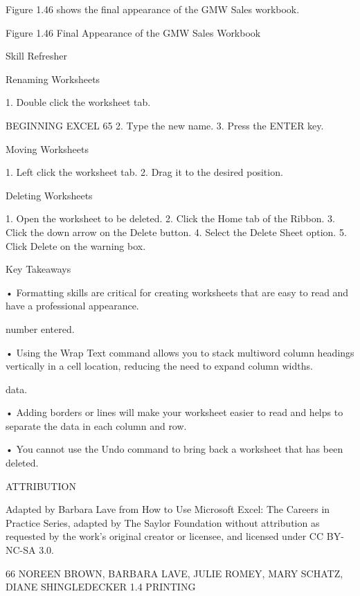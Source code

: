 Figure 1.46 shows the final appearance of the GMW Sales workbook.




Figure 1.46 Final Appearance of the GMW Sales Workbook




Skill Refresher


Renaming Worksheets

1. Double click the worksheet tab.


BEGINNING EXCEL 65
2. Type the new name.
3. Press the ENTER key.

Moving Worksheets

1. Left click the worksheet tab.
2. Drag it to the desired position.

Deleting Worksheets

1. Open the worksheet to be deleted.
2. Click the Home tab of the Ribbon.
3. Click the down arrow on the Delete button.
4. Select the Delete Sheet option.
5. Click Delete on the warning box.




Key Takeaways


• Formatting skills are critical for creating worksheets that are easy to read and have a professional
appearance.

number entered.

• Using the Wrap Text command allows you to stack multiword column headings vertically in a cell location,
reducing the need to expand column widths.

data.

• Adding borders or lines will make your worksheet easier to read and helps to separate the data in each
column and row.

• You cannot use the Undo command to bring back a worksheet that has been deleted.



ATTRIBUTION

Adapted by Barbara Lave from How to Use Microsoft Excel: The Careers in Practice Series, adapted
by The Saylor Foundation without attribution as requested by the work’s original creator or
licensee, and licensed under CC BY-NC-SA 3.0.




66 NOREEN BROWN, BARBARA LAVE, JULIE ROMEY, MARY SCHATZ, DIANE SHINGLEDECKER
1.4 PRINTING





